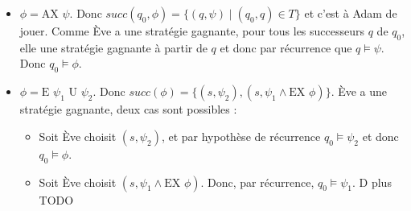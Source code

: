 \documentclass[10pt,a4paper]{article}
\begin{document}
\begin{itemize}
\item $\phi = \mbox{AX } \psi$. Donc $succ(q_0, \phi) = \{ (q, \psi) \mid (q_0,q) \in T \} $ et c'est à Adam de jouer. Comme Ève a une stratégie gagnante, pour tous les successeurs $q$ de $q_0$, elle une stratégie gagnante à partir de $q$ et donc par récurrence que $q \vDash \psi$. Donc $q_0 \vDash \phi$.

\item $\phi = \mbox{E } \psi_1 \mbox{ U } \psi_2$. Donc $succ(\phi) = \{ (s,\psi_2), (s, \psi_1 \land \mbox{EX } \phi) \}$. Ève a une stratégie gagnante, deux cas sont possibles :
\begin{itemize}
	\item Soit Ève choisit $(s,\psi_2)$, et par hypothèse de récurrence $q_0 \vDash \psi_2$ et donc $q_0 \vDash \phi$.
	\item Soit Ève choisit $(s, \psi_1 \land \mbox{EX } \phi)$. Donc, par récurrence, $q_0 \vDash \psi_1$. D plus TODO
\end{itemize}
\end{itemize}
\end{document}
